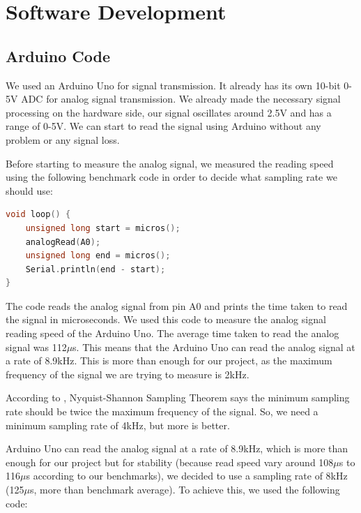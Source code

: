 \chapter{Software Development}

\section{Arduino Code}\label{sec:arduino_code}

We used an Arduino Uno for signal transmission. It already has its own 10-bit 0-5V ADC for analog signal transmission. We already made the necessary signal processing on the hardware side, our signal oscillates around 2.5V and has a range of 0-5V. We can start to read the signal using Arduino without any problem or any signal loss.


Before starting to measure the analog signal, we measured the reading speed using the following benchmark code in order to decide what sampling rate we should use:

\begin{lstlisting}[language=C++, caption=Analog Read Benchmark Code, label=lst:analog_read_benchmark]
void loop() {
    unsigned long start = micros();
    analogRead(A0);
    unsigned long end = micros();
    Serial.println(end - start);
}
\end{lstlisting}

The code reads the analog signal from pin A0 and prints the time taken to read the signal in microseconds. We used this code to measure the analog signal reading speed of the Arduino Uno. The average time taken to read the analog signal was 112$\mu$s. This means that the Arduino Uno can read the analog signal at a rate of 8.9kHz. This is more than enough for our project, as the maximum frequency of the signal we are trying to measure is 2kHz.

According to \textcite{Wikiedia-NyquistShannon2024}, Nyquist-Shannon Sampling Theorem says the minimum sampling rate should be twice the maximum frequency of the signal. So, we need a minimum sampling rate of 4kHz, but more is better.

\newpage
\thispagestyle{plain}

Arduino Uno can read the analog signal at a rate of 8.9kHz, which is more than enough for our project but for stability (because read speed vary around 108$\mu$s to 116$\mu$s according to our benchmarks), we decided to use a sampling rate of 8kHz (125$\mu$s, more than benchmark average). To achieve this, we used the following code:


